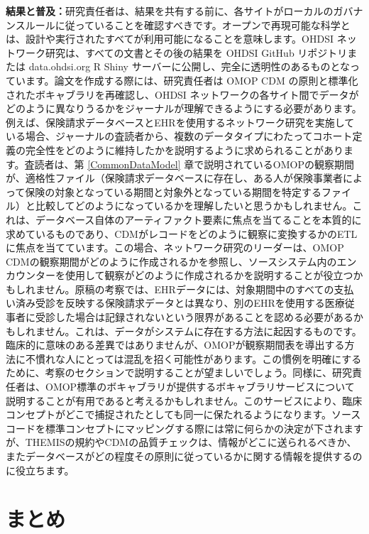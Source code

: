 \documentclass[
  11pt]{book}
\theoremstyle{definition}
\theoremstyle{definition}
\theoremstyle{definition}
\theoremstyle{definition}
\theoremstyle{remark}
\begin{document}
\textbf{結果と普及：}研究責任者は、結果を共有する前に、各サイトがローカルのガバナンスルールに従っていることを確認すべきです。オープンで再現可能な科学とは、設計や実行されたすべてが利用可能になることを意味します。OHDSI ネットワーク研究は、すべての文書とその後の結果を OHDSI GitHub リポジトリまたは data.ohdsi.org R Shiny サーバーに公開し、完全に透明性のあるものとなっています。論文を作成する際には、研究責任者は OMOP CDM の原則と標準化されたボキャブラリを再確認し、OHDSI ネットワークの各サイト間でデータがどのように異なりうるかをジャーナルが理解できるようにする必要があります。例えば、保険請求データベースとEHRを使用するネットワーク研究を実施している場合、ジャーナルの査読者から、複数のデータタイプにわたってコホート定義の完全性をどのように維持したかを説明するように求められることがあります。査読者は、第 \ref{CommonDataModel} 章で説明されているOMOPの観察期間が、適格性ファイル（保険請求データベースに存在し、ある人が保険事業者によって保険の対象となっている期間と対象外となっている期間を特定するファイル）と比較してどのようになっているかを理解したいと思うかもしれません。これは、データベース自体のアーティファクト要素に焦点を当てることを本質的に求めているものであり、CDMがレコードをどのように観察に変換するかのETLに焦点を当てています。この場合、ネットワーク研究のリーダーは、OMOP CDMの観察期間がどのように作成されるかを参照し、ソースシステム内のエンカウンターを使用して観察がどのように作成されるかを説明することが役立つかもしれません。原稿の考察では、EHRデータには、対象期間中のすべての支払い済み受診を反映する保険請求データとは異なり、別のEHRを使用する医療従事者に受診した場合は記録されないという限界があることを認める必要があるかもしれません。これは、データがシステムに存在する方法に起因するものです。臨床的に意味のある差異ではありませんが、OMOPが観察期間表を導出する方法に不慣れな人にとっては混乱を招く可能性があります。この慣例を明確にするために、考察のセクションで説明することが望ましいでしょう。同様に、研究責任者は、OMOP標準のボキャブラリが提供するボキャブラリサービスについて説明することが有用であると考えるかもしれません。このサービスにより、臨床コンセプトがどこで捕捉されたとしても同一に保たれるようになります。ソースコードを標準コンセプトにマッピングする際には常に何らかの決定が下されますが、THEMISの規約やCDMの品質チェックは、情報がどこに送られるべきか、またデータベースがどの程度その原則に従っているかに関する情報を提供するのに役立ちます。

\section{まとめ}\label{ux307eux3068ux3081-17}
\end{document}

